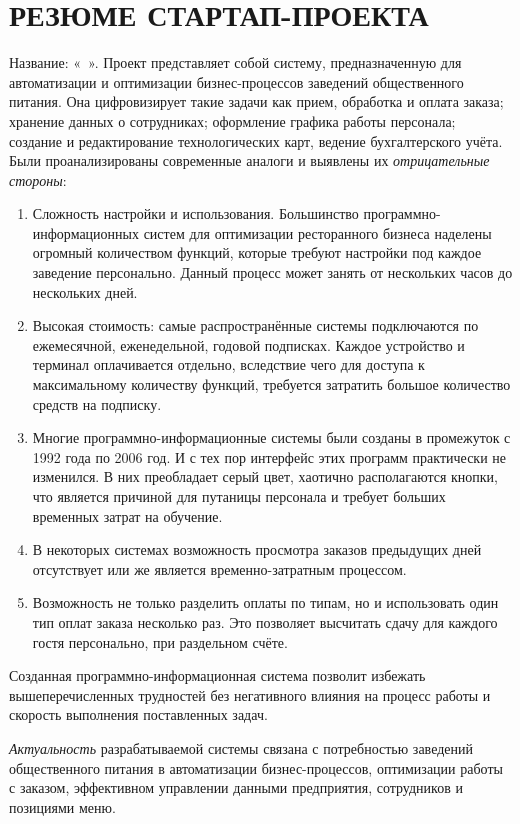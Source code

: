 \section*{РЕЗЮМЕ СТАРТАП-ПРОЕКТА}
Название: «\ ». Проект представляет собой систему, предназначенную  для автоматизации и оптимизации бизнес-процессов заведений общественного питания. Она цифровизирует такие задачи как прием, обработка и оплата заказа; хранение данных о сотрудниках; оформление графика работы персонала; создание и редактирование технологических карт, ведение бухгалтерского учёта. Были проанализированы современные аналоги и выявлены их \textit{отрицательные стороны}:
\begin{enumerate}
	\item Сложность настройки и использования. Большинство программно-информационных систем для оптимизации ресторанного бизнеса наделены огромный количеством функций, которые требуют настройки под каждое заведение персонально. Данный процесс может занять от нескольких часов до нескольких дней.
	\item Высокая стоимость: самые распространённые системы подключаются по ежемесячной, еженедельной, годовой подписках. Каждое устройство и терминал оплачивается отдельно, вследствие чего для доступа к максимальному количеству функций, требуется затратить большое количество средств на подписку. 
	\item Многие программно-информационные системы были созданы в промежуток с 1992 года по 2006 год. И с тех пор интерфейс этих программ практически не изменился. В них преобладает серый цвет, хаотично располагаются кнопки, что является причиной для путаницы персонала и требует больших временных затрат на обучение.
	\item В некоторых системах возможность просмотра заказов предыдущих дней отсутствует или же является временно-затратным процессом.
	\item Возможность не только разделить оплаты по типам, но и использовать один тип оплат заказа несколько раз. Это позволяет высчитать сдачу для каждого гостя персонально, при раздельном счёте.
\end{enumerate} 


Созданная программно-информационная система позволит избежать вышеперечисленных трудностей без негативного влияния на процесс работы и скорость выполнения поставленных задач.

\textit{Актуальность} разрабатываемой системы связана с потребностью заведений общественного питания в автоматизации бизнес-процессов, оптимизации работы с заказом, эффективном управлении данными предприятия, сотрудников и позициями меню. 

